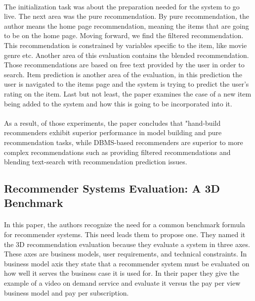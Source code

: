 \paragraph{}The initialization task was about the preparation needed for the system to go live. The next area was the pure recommendation. By pure recommendation, the author means the home page recommendation, meaning the items that are going to be on the home page. Moving forward, we find the filtered recommendation. This recommendation is constrained by variables specific to the item, like movie genre etc. Another area of this evaluation contains the blended recommendation. Those recommendations are based on free text provided by the user in order to search. Item prediction is another area of the evaluation, in this prediction the user is navigated to the items page and the system is trying to predict the user's rating on the item. Last but not least, the paper examines the case of a new item being added to the system and how this is going to be incorporated into it.

\paragraph{}As a result, of those experiments, the paper concludes that "hand-build recommenders exhibit superior performance in model building and pure recommendation tasks, while DBMS-based recommenders are superior to more complex recommendations such as providing filtered recommendations and blending text-search with recommendation prediction issues.

\subsection{Recommender Systems Evaluation: A 3D Benchmark \cite{said2012recommender}}
\paragraph{}In this paper, the authors recognize the need for a common benchmark formula for recommender systems. This need leads them to propose one. They named it the 3D recommendation evaluation because they evaluate a system in three axes. These axes are business models, user requirements, and technical constraints. In business model axis they state that a recommender system must be evaluated on how well it serves the business case it is used for. In their paper they give the example of a video on demand service and evaluate it versus the pay per view business model and pay per subscription.

